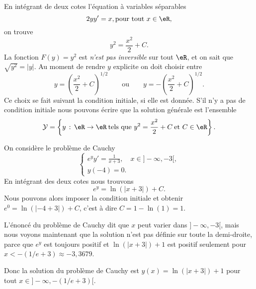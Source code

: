 \begin{example}
  En intégrant de deux cotes l'équation à variables séparables
  \begin{equation}
    2y y' = x, \text{pour tout } x\in\eR,
  \end{equation}
  on trouve 
  \[
  y^2 = \frac{x^2}{2} + C .
  \]
La fonction $F(y) = y^2$ est \emph{n'est pas inversible} sur tout $\eR$, et on sait que \(\sqrt{y^2} = |y|\).  Au moment de rendre $y$ explicite on doit choisir entre  
\[
y = \left(\frac{x^2}{2} + C \right)^{1/2}\qquad \text{ou}\qquad y = -\left(\frac{x^2}{2} + C \right)^{1/2} .
\]
Ce choix se fait suivant la condition initiale, si elle est donnée. S'il n'y a pas de condition initiale nous pouvons écrire que la solution générale est l'ensemble
\[
\mathcal{Y} =\left\{ y \,:\, \eR \to \eR\:\text{tels que }  y^2 = \frac{x^2}{2} + C \:\text{et } C\in\eR\right\}. 
\]
\end{example}

\begin{example}
  On considère le problème de Cauchy
  \begin{equation}
    \begin{cases}
      e^y y' = \frac{1}{x+3}, \quad x\in ]-\infty, -3[,\\
      y(-4) = 0.
    \end{cases}
  \end{equation}
En intégrant des deux cotes nous trouvons
\[
e^y = \ln(|x+3|) +C.
\]
Nous pouvons alors imposer la condition initiale et obtenir $e^{0} =\ln(|-4+3|) +C $, c'est \`a dire $C = 1- \ln(1) = 1$.
\begin{remark}
  L'énoncé du problème de Cauchy dit que $x$ peut varier dans \(]-\infty, -3[\), mais nous voyons maintenant que la solution n'est pas définie sur toute la demi-droite, parce que $e^y$ est toujours positif  et $\ln(|x+3|) +1$ est positif seulement pour $x < -(1/e + 3)\approx -3,3679$. 
\end{remark}
Donc la solution du problème de Cauchy est \(y(x) = \ln(|x+3|) +1\) pour tout $x\in ]-\infty, -(1/e +3)[$.
\end{example}

